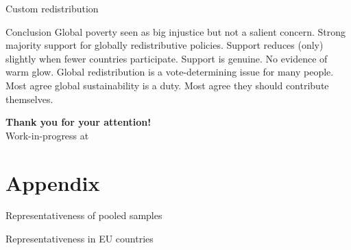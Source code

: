 \documentclass[aspectratio=169,xcolor=dvipsnames, 11pt,mathserif]{beamer}
\begin{document}
\begin{frame}{Custom redistribution \href{run:survey_custom_redistr.mp4}{} \href{https://bit.ly/custom_redistr}{}}
{\begin{figure}
\begin{subfigure}{.6\textwidth}
      \end{subfigure}
    \end{figure}}
\end{frame}

\begin{frame}{Conclusion}
\bbsp
\ip Global poverty seen as big injustice but not a salient concern.
\ip Strong majority support for globally redistributive policies.
\ip Support reduces (only) slightly when fewer countries participate.
\ip Support is genuine. No evidence of warm glow.
\ip Global redistribution is a vote-determining issue for many people. %
\ip Most agree global sustainability is a duty.
\ip Most agree they should contribute themselves.
\ip \begin{center} \textbf{Thank you for your attention!} \\   Work-in-progress at  \end{center}
\ee
\end{frame}

\appendix 
\section{Appendix}

\begin{frame}{Representativeness of pooled samples \hyperlink{data}{} \label{representativeness}}
    \vspace{-.6cm}
    \begin{table}[h]
        \makebox[\textwidth][c]{
            \resizebox*{!}{1.4\textheight}{
            
            }
        }
    \end{table}  
\end{frame}

\begin{frame}{Representativeness in EU countries \hyperlink{data}{} \label{representativeness}}
    \vspace{-.6cm}
    \begin{table}[h]
        \makebox[\textwidth][c]{
            \resizebox*{!}{.97\textheight}{
            
            }
        }
    \end{table}  
\end{frame}
\end{document}

